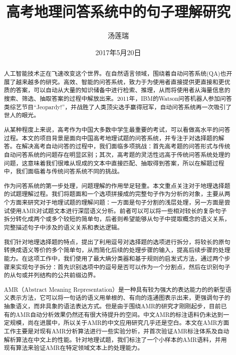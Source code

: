 \documentclass[master, winfont]{njuthesis}
\title{高考地理问答系统中的句子理解研究}
\author{汤莲瑞}
\institute{南京大学}
\date{2017年5月20日}
\begin{document}

\maketitle
\makeenglishtitle


\frontmatter

\begin{abstract}
人工智能技术正在飞速改变这个世界。在自然语言领域，围绕着自动问答系统(QA)也开展了越来越多的研究。高效、智能的问答系统，致力于为使用者直接提供更直接和更优质的答案，可以自动从大量的知识储备中进行检索、推理，从而将使用者从海量信息的搜索、筛选、抽取答案的过程中解放出来。2011年，IBM的Watson问答机器人参加问答类综艺节目“Jeopardy!”，并战胜了人类顶尖选手赢得冠军，自动问答系统再一次吸引了世人的眼光。

从某种程度上来说，高考作为中国大多数中学生最重要的考试，可以看做高水平的问答过程。本文的项目背景是面向中国高考地理试题的问答系统，并专注于对选择题的解答。在解决高考自动问答的过程中，我们面临多项挑战：首先高考题的问答形式与传统自动问答系统的问题存在明显区别；其次，高考题的灵活性远高于传统问答系统处理的问题，这意味着我们很难从现成的文本中直接匹配、抽取得到答案，所以在解题过程中，我们面临着与传统问答系统不同的挑战。

作为问答系统的第一步处理，问题理解的作用举足轻重。本文重点关注对于地理选择题的试题理解过程。我们将题面和一个选项拼接成的完整句子作为分析的对象，主要从两个方面来研究对于地理试题的理解问题：一方面是句子分割的浅层处理，另一方面是尝试使用AMR对试题文本进行深层语义分析。前者可以可以将一些相对较长的复杂句子拆分转化成两个或多个较短的简单句，后者则希望能够从句子中提取概念的语义关系，完整描述句子中涉及的语义关系和表达逻辑。

我们针对地理选择题的特点，提出了利用逗号对选择题的选项进行拆分，将较长的原句转换成语义等价的多个简单句，从而简化后续的处理步骤的输入，提高后续步骤的处理能力。在这项工作中，我们使用了最大熵分类器和基于规则的启发式方法，通过两个步骤来实现句子拆分：首先识别选项中的逗号是否可以作为一个分割点，然后在识别句子的从句或并列结构的公共前缀边界。

AMR（Abstract Meaning Representation）是一种具有较为强大的表达能力的的新型语义表示方法，它可以将一句话的语义用单根的、有向的连通图表示出来，更强调句子的抽象语义，而非具象的语法表达方式。但是由于围绕AMR的研究才刚刚起步，目前已有的AMR自动分析效果仍然还有很大待提升的空间。中文AMR的标注语料仍未达到一定规模，尚在进展中，所以关于AMR的中文应用研究几乎还是空白。本文在AMR方面工作主要是对现有AMR分析算法进行一些实验分析，并首次验证AMR标注体系及自动解析算法在中文上的性能。针对地理试题，我们标注了一个小样本的AMR语料，并用现有算法来验证AMR在特定领域文本上的处理能力。


\end{abstract}
\end{document}
